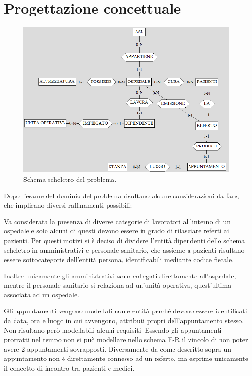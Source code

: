 \documentclass[a4paper,12pt]{report}
\begin{document}
\chapter{Progettazione concettuale}
\begin{figure}[H]
	\centering{}
	\includegraphics[width=\textwidth]{img/scheletro.png}
	\caption{Schema scheletro del problema.}
	\label{img:scheletro}
\end{figure}
Dopo l'esame del dominio del problema risultano alcune considerazioni da fare, che implicano diversi raffinamenti possibili:

Va considerata la presenza di diverse categorie di lavoratori all'interno di un ospedale e solo alcuni di questi devono essere in grado di rilasciare
referti ai pazienti. Per questi motivi si è deciso di dividere l'entità dipendenti dello schema scheletro in amministrativi e personale sanitario, che assieme a pazienti
risultano essere sottocategorie dell'entità persona, identificabili mediante codice fiscale.

Inoltre unicamente gli amministrativi sono collegati direttamente all'ospedale, mentre il personale sanitario si relaziona ad un'unità operativa, quest'ultima associata 
ad un ospedale.

Gli appuntamenti vengono modellati come entità perché devono essere identificati da data, ora e luogo in cui avvengono, attributi propri dell'appuntamento 
stesso. Non risultano però modellabili alcuni requisiti. Essendo gli appuntamenti protratti nel tempo non si può modellare nello schema E-R il vincolo di 
non poter avere 2 appuntamenti sovrapposti. Diversamente da come descritto sopra un appuntamento non è direttamente connesso ad un referto, ma esprime
unicamente il concetto di incontro tra pazienti e medici.
\end{document}
